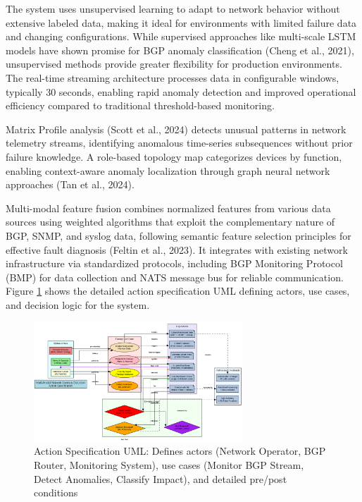 \documentclass[11pt]{article}
\begin{document}
The system uses unsupervised learning to adapt to network behavior without extensive labeled data, making it ideal for environments with limited failure data and changing configurations. While supervised approaches like multi-scale LSTM models have shown promise for BGP anomaly classification (Cheng et al., 2021), unsupervised methods provide greater flexibility for production environments. The real-time streaming architecture processes data in configurable windows, typically 30 seconds, enabling rapid anomaly detection and improved operational efficiency compared to traditional threshold-based monitoring.

Matrix Profile analysis (Scott et al., 2024) detects unusual patterns in network telemetry streams, identifying anomalous time-series subsequences without prior failure knowledge. A role-based topology map categorizes devices by function, enabling context-aware anomaly localization through graph neural network approaches (Tan et al., 2024).

Multi-modal feature fusion combines normalized features from various data sources using weighted algorithms that exploit the complementary nature of BGP, SNMP, and syslog data, following semantic feature selection principles for effective fault diagnosis (Feltin et al., 2023). It integrates with existing network infrastructure via standardized protocols, including BGP Monitoring Protocol (BMP) for data collection and NATS message bus for reliable communication. Figure \ref{fig:action_spec} shows the detailed action specification UML defining actors, use cases, and decision logic for the system.

\begin{figure}[h]
\centering
\includegraphics[width=0.7\textwidth]{action_specification.png}
\caption{Action Specification UML: Defines actors (Network Operator, BGP Router, Monitoring System), use cases (Monitor BGP Stream, Detect Anomalies, Classify Impact), and detailed pre/post conditions}
\label{fig:action_spec}
\end{figure}
\end{document}
